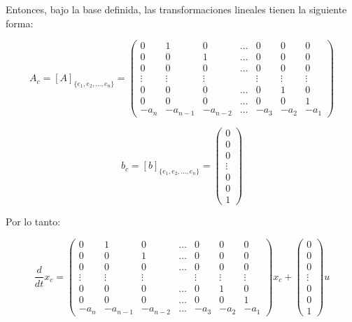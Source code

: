 Entonces, bajo la base definida, las transformaciones lineales tienen la siguiente forma:

\begin{equation}
A_c = \left[ A \right]_{\{ e_1, e_2, \dots, e_n \}} =
\begin{pmatrix}
0 & 1 & 0 & \dots & 0 & 0 & 0 \\
0 & 0 & 1 & \dots & 0 & 0 & 0 \\
0 & 0 & 0 & \dots & 0 & 0 & 0 \\
\vdots & \vdots & \vdots & & \vdots & \vdots & \vdots \\
0 & 0 & 0 & \dots & 0 & 1 & 0 \\
0 & 0 & 0 & \dots & 0 & 0 & 1 \\
-a_{n} & -a_{n-1} & -a_{n-2} & \dots & -a_{3} & -a_{2} & -a_{1}
\end{pmatrix}
\end{equation}

\begin{equation}
b_c = \left[ b \right]_{\{ e_1, e_2, \dots, e_n \}} =
\begin{pmatrix}
0 \\
0 \\
0 \\
\vdots \\
0 \\
0 \\
1
\end{pmatrix}
\end{equation}

Por lo tanto:

\begin{equation}
\frac{d}{dt} x_c =
\begin{pmatrix}
0 & 1 & 0 & \dots & 0 & 0 & 0 \\
0 & 0 & 1 & \dots & 0 & 0 & 0 \\
0 & 0 & 0 & \dots & 0 & 0 & 0 \\
\vdots & \vdots & \vdots & & \vdots & \vdots & \vdots \\
0 & 0 & 0 & \dots & 0 & 1 & 0 \\
0 & 0 & 0 & \dots & 0 & 0 & 1 \\
-a_{n} & -a_{n-1} & -a_{n-2} & \dots & -a_{3} & -a_{2} & -a_{1}
\end{pmatrix} x_c +
\begin{pmatrix}
0 \\
0 \\
0 \\
\vdots \\
0 \\
0 \\
1
\end{pmatrix} u
\end{equation}

